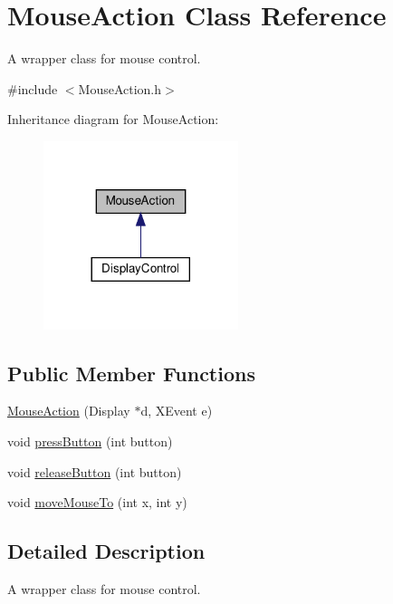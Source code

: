 \hypertarget{classMouseAction}{}\section{Mouse\+Action Class Reference}
\label{classMouseAction}


A wrapper class for mouse control.  




{\ttfamily \#include $<$Mouse\+Action.\+h$>$}



Inheritance diagram for Mouse\+Action\+:\nopagebreak
\begin{figure}[H]
\begin{center}
\leavevmode
\includegraphics[width=161pt]{classMouseAction__inherit__graph}
\end{center}
\end{figure}
\subsection*{Public Member Functions}
\begin{DoxyCompactItemize}
\item 
\hyperlink{classMouseAction_a42e540b994144f3f8775baded5370b14}{Mouse\+Action} (Display $\ast$d, X\+Event e)
\item 
void \hyperlink{classMouseAction_aa017b86a7e358e7a74a8ec50a5a191cf}{press\+Button} (int button)
\item 
void \hyperlink{classMouseAction_ab1ac193e88baf8614c55ca2fa7a3b430}{release\+Button} (int button)
\item 
void \hyperlink{classMouseAction_a7a14cab01ad2ccdb1b135d4bae939fe2}{move\+Mouse\+To} (int x, int y)
\end{DoxyCompactItemize}


\subsection{Detailed Description}
A wrapper class for mouse control. 

